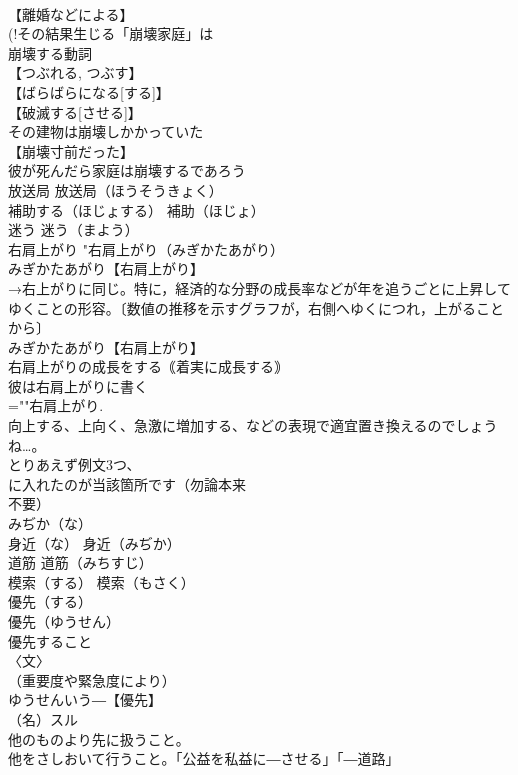 \documentclass[8pt]{extreport}
\begin{document}
\begin{CJK}{UTF8}{min}
\\	【離婚などによる】
\\	(!その結果生じる「崩壊家庭」は 
\\	崩壊する動詞
\\	【つぶれる, つぶす】
\\	【ばらばらになる[する]】
\\	【破滅する[させる]】
\\	その建物は崩壊しかかっていた
\\	【崩壊寸前だった】
\\	彼が死んだら家庭は崩壊するであろう
\\	放送局		放送局（ほうそうきょく）
\\	補助する（ほじょする）		補助（ほじょ）
\\	迷う		迷う（まよう）
\\	右肩上がり		"右肩上がり（みぎかたあがり）
\\	みぎかたあがり【右肩上がり】
\\	→右上がりに同じ。特に，経済的な分野の成長率などが年を追うごとに上昇してゆくことの形容。〔数値の推移を示すグラフが，右側へゆくにつれ，上がることから〕
\\	みぎかたあがり【右肩上がり】
\\	右肩上がりの成長をする｟着実に成長する｠
\\	彼は右肩上がりに書く
\\	=""右肩上がり.
\\	向上する、上向く、急激に増加する、などの表現で適宜置き換えるのでしょうね…。
\\	とりあえず例文3つ、
\\	に入れたのが当該箇所です（勿論本来 
\\	不要）
\\	みぢか（な）
\\	身近（な）		身近（みぢか）
\\	道筋		道筋（みちすじ）
\\	模索（する）		模索（もさく）
\\	優先（する）
\\	優先（ゆうせん）
\\	優先すること
\\	〈文〉
\\	（重要度や緊急度により）
\\	ゆうせんいう―【優先】
\\	（名）スル
\\	他のものより先に扱うこと。
\\	他をさしおいて行うこと。「公益を私益に―させる」「―道路」

\end{CJK}
\end{document}
